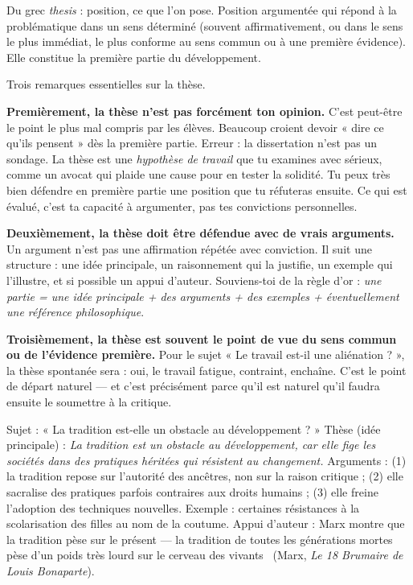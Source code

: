 \documentclass[11pt]{article}
\newcounter{popsec}
\newcounter{popsub}
\newcommand{\courssub}[1]{%
  \stepcounter{popsub}%
  \par\vspace{9pt}\noindent{\popxbold\fontsize{11.5}{13}\selectfont\color{popink}{\color{poporange}\thepopsec.\thepopsub}\hspace{6pt}#1}\par\nopagebreak\vspace{4pt}
}
\begin{document}
\courssub{La thèse : la première réponse, défendue avec force}

\begin{definition}[La thèse]
Du grec \emph{thesis} : position, ce que l'on pose. Position argumentée qui répond à la problématique dans un sens déterminé (souvent affirmativement, ou dans le sens le plus immédiat, le plus conforme au sens commun ou à une première évidence). Elle constitue la première partie du développement.
\end{definition}

Trois remarques essentielles sur la thèse.

\textbf{Premièrement, la thèse n'est pas forcément ton opinion.} C'est peut-être le point le plus mal compris par les élèves. Beaucoup croient devoir « dire ce qu'ils pensent » dès la première partie. Erreur : la dissertation n'est pas un sondage. La thèse est une \emph{hypothèse de travail} que tu examines avec sérieux, comme un avocat qui plaide une cause pour en tester la solidité. Tu peux très bien défendre en première partie une position que tu réfuteras ensuite. Ce qui est évalué, c'est ta capacité à argumenter, pas tes convictions personnelles.

\textbf{Deuxièmement, la thèse doit être défendue avec de vrais arguments.} Un argument n'est pas une affirmation répétée avec conviction. Il suit une structure : une idée principale, un raisonnement qui la justifie, un exemple qui l'illustre, et si possible un appui d'auteur. Souviens-toi de la règle d'or : \emph{une partie = une idée principale + des arguments + des exemples + éventuellement une référence philosophique}.

\textbf{Troisièmement, la thèse est souvent le point de vue du sens commun ou de l'évidence première.} Pour le sujet « Le travail est-il une aliénation ? », la thèse spontanée sera : oui, le travail fatigue, contraint, enchaîne. C'est le point de départ naturel — et c'est précisément parce qu'il est naturel qu'il faudra ensuite le soumettre à la critique.

\begin{exemplebox}
Sujet : « La tradition est-elle un obstacle au développement ? »
Thèse (idée principale) : \emph{La tradition est un obstacle au développement, car elle fige les sociétés dans des pratiques héritées qui résistent au changement.}
Arguments : (1) la tradition repose sur l'autorité des ancêtres, non sur la raison critique ; (2) elle sacralise des pratiques parfois contraires aux droits humains ; (3) elle freine l'adoption des techniques nouvelles.
Exemple : certaines résistances à la scolarisation des filles au nom de la coutume.
Appui d'auteur : Marx montre que la tradition pèse sur le présent — \guillemotleft la tradition de toutes les générations mortes pèse d'un poids très lourd sur le cerveau des vivants \guillemotright\ (Marx, \emph{Le 18 Brumaire de Louis Bonaparte}).
\end{exemplebox}
\end{document}

